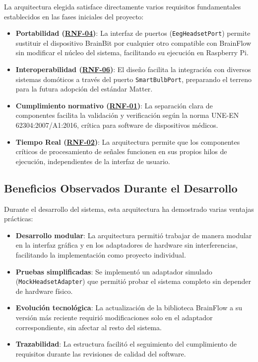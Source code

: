 La arquitectura elegida satisface directamente varios requisitos fundamentales establecidos en las fases iniciales del proyecto:

\begin{itemize}
    \item \textbf{Portabilidad (\hyperref[rnf-04]{RNF-04})}: La interfaz de puertos (\texttt{EegHeadsetPort}) permite sustituir el dispositivo BrainBit por cualquier otro compatible con BrainFlow sin modificar el núcleo del sistema, facilitando su ejecución en Raspberry Pi.
    
    \item \textbf{Interoperabilidad (\hyperref[rnf-06]{RNF-06})}: El diseño facilita la integración con diversos sistemas domóticos a través del puerto \texttt{SmartBulbPort}, preparando el terreno para la futura adopción del estándar Matter.
    
    \item \textbf{Cumplimiento normativo (\hyperref[rnf-01]{RNF-01})}: La separación clara de componentes facilita la validación y verificación según la norma UNE-EN 62304:2007/A1:2016, crítica para software de dispositivos médicos.
    
    \item \textbf{Tiempo Real (\hyperref[rnf-02]{RNF-02})}: La arquitectura permite que los componentes críticos de procesamiento de señales funcionen en sus propios hilos de ejecución, independientes de la interfaz de usuario.
\end{itemize}

\subsection{Beneficios Observados Durante el Desarrollo}

Durante el desarrollo del sistema, esta arquitectura ha demostrado varias ventajas prácticas:

\begin{itemize}
    \item \textbf{Desarrollo modular}: La arquitectura permitió trabajar de manera modular en la interfaz gráfica y en los adaptadores de hardware sin interferencias, facilitando la implementación como proyecto individual.
    
    \item \textbf{Pruebas simplificadas}: Se implementó un adaptador simulado (\texttt{MockHeadsetAdapter}) que permitió probar el sistema completo sin depender de hardware físico.
    
    \item \textbf{Evolución tecnológica}: La actualización de la biblioteca BrainFlow a su versión más reciente requirió modificaciones solo en el adaptador correspondiente, sin afectar al resto del sistema.
    
    \item \textbf{Trazabilidad}: La estructura facilitó el seguimiento del cumplimiento de requisitos durante las revisiones de calidad del software.
\end{itemize}

